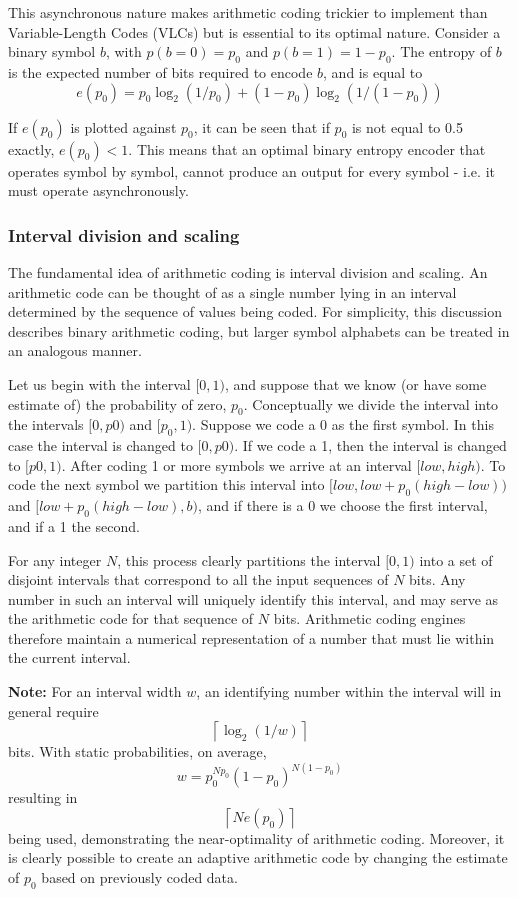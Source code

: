 \begin{informative*}
This asynchronous nature makes arithmetic coding trickier to implement 
than Variable-Length Codes (VLCs) but is essential to its optimal nature. Consider
a binary symbol $b$, with $p(b=0)=p_0$ and $p(b=1)=1-p_0$. The entropy of $b$
is the expected number of bits required to encode $b$, and is equal to
\[e(p_0)=p_0\log_2(1/p_0)+(1-p_0)\log_2(1/(1-p_0))\]

If $e(p_0)$ is plotted against $p_0$, it can be seen that if $p_0$ is not equal
to 0.5 exactly, $e(p_0)<1$. This means that an optimal binary entropy encoder
that operates symbol by symbol, cannot produce an output for every symbol - i.e.
it must operate asynchronously.

\subsubsection{Interval division and scaling}
The fundamental idea of arithmetic coding is interval division and scaling. An
arithmetic code can be thought of as a single number lying in an interval 
determined by the sequence of values being coded. For simplicity, this discussion
describes binary arithmetic coding, but larger symbol alphabets can be treated
in an analogous manner.

Let us begin with the interval $[0,1)$, and suppose that we know (or have some 
estimate of) the probability of zero, $p_0$. Conceptually we divide the interval
into the intervals $[0,p0)$ and $[p_0,1)$. Suppose we code a 0 as the
first symbol. In this case the interval is changed to $[0,p0)$. If we code a 1,
then the interval is changed to $[p0,1)$. After coding 1 or more symbols we 
arrive at an interval $[low,high)$. To code the next symbol we partition this interval
into $[low,low+p_0(high-low))$ and $[low+p_0(high-low),b)$, and if there is a 0 we choose the
first interval, and if a 1 the second.

For any integer $N$, this process clearly partitions the interval $[0,1)$ into 
a set of disjoint intervals that correspond to all the input sequences of $N$ bits.
Any number in such an interval will uniquely identify this interval, and may
serve as the arithmetic code for that sequence of $N$ bits. Arithmetic coding
engines therefore maintain a numerical representation of a number that must
lie within the current interval.

{\bf Note: }For an interval width $w$, an identifying number within the interval will in general require 
\[\left\lceil\log_2(1/w)\right\rceil\]
bits. With static probabilities, on average,
\[w=p_0^{Np_0}(1-p_0)^{N(1-p_0)}\]
resulting in 
\[\left\lceil Ne(p_0)\right\rceil\]
being used, demonstrating the near-optimality of arithmetic coding.
Moreover, it is clearly possible to create an adaptive arithmetic code by
changing the estimate of $p_0$ based on previously coded data.


\end{informative*}
